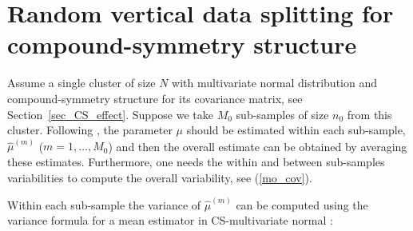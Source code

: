 \documentclass[11pt,a5paper,twoside]{book}
\begin{document}
{\section[Random vertical data splitting for CS]{Random vertical data splitting for compound-symmetry structure}
\label{app2}
Assume a single cluster of size $N$ with multivariate normal distribution and compound-symmetry structure for its covariance matrix, see Section~\ref{sec_CS_effect}. Suppose we take $M_0$ sub-samples of size $n_0$ from this cluster. Following \cite{hoffman2001}, the parameter $\mu$ should be estimated within each sub-sample, $\widehat{\mu}^{(m)}$ ($m=1,\ldots,M_0$) and then the overall estimate can be obtained by averaging these estimates. Furthermore, one needs the within and between sub-samples variabilities to compute the overall variability, see (\ref{mo_cov}).

Within each sub-sample the variance of $\widehat{\mu}^{(m)}$ can be computed using the variance formula for a mean estimator in CS-multivariate normal \cite{Iddi2011} :

}
\end{document}
